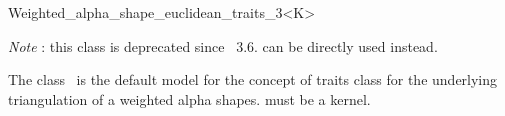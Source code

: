 %
%
%
%
%
%
%
%
%
%
%



\begin{ccRefClass} {Weighted_alpha_shape_euclidean_traits_3<K>}

\begin{ccDeprecated}
{\em Note} : this class is deprecated since \cgal\ 3.6.  
 can be directly used instead.



\ccDefinition

The class \ccRefName\ is the default  model for the concept
 of traits class for
the underlying triangulation of a weighted alpha shapes.
 must be a kernel.


\ccRefines
{}


\ccIsModel
{}

\end{ccDeprecated}

\end{ccRefClass}
